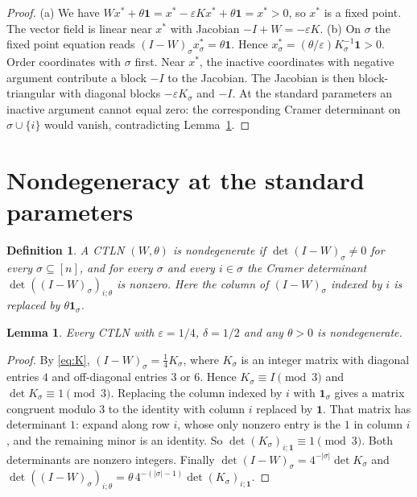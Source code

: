 \documentclass[11pt]{amsart}
\newtheorem{lemma}[theorem]{Lemma}
\newtheorem{definition}[theorem]{Definition}
\theoremstyle{remark}
\newcommand{\one}{\mathbf 1}
\begin{document}
\begin{proof}
(a) We have $Wx^*+\theta\one=x^*-\varepsilon Kx^*+\theta\one=x^*>0$, so $x^*$ is a fixed point. The vector field is linear near $x^*$ with Jacobian $-I+W=-\varepsilon K$.
(b) On $\sigma$ the fixed point equation reads $(I-W)_\sigma x^*_\sigma=\theta\one$. Hence $x^*_\sigma=(\theta/\varepsilon)K_\sigma^{-1}\one>0$. Order coordinates with $\sigma$ first. Near $x^*$, the inactive coordinates with negative argument contribute a block $-I$ to the Jacobian. The Jacobian is then block-triangular with diagonal blocks $-\varepsilon K_\sigma$ and $-I$. At the standard parameters an inactive argument cannot equal zero: the corresponding Cramer determinant on $\sigma\cup\{i\}$ would vanish, contradicting Lemma~\ref{lem:mod3}.
\end{proof}

\section{Nondegeneracy at the standard parameters}

\begin{definition}\label{def:nondeg}
\cite[Definition~2.1]{CGM2024} A CTLN $(W,\theta)$ is \emph{nondegenerate} if $\det(I-W)_\sigma\ne0$ for every $\sigma\subseteq[n]$, and for every $\sigma$ and every $i\in\sigma$ the Cramer determinant $\det((I-W)_\sigma)_{i;\theta}$ is nonzero. Here the column of $(I-W)_\sigma$ indexed by $i$ is replaced by $\theta\one_\sigma$.
\end{definition}

\begin{lemma}\label{lem:mod3}
Every CTLN with $\varepsilon=1/4$, $\delta=1/2$ and any $\theta>0$ is nondegenerate.
\end{lemma}

\begin{proof}
By \eqref{eq:K}, $(I-W)_\sigma=\tfrac14K_\sigma$, where $K_\sigma$ is an integer matrix with diagonal entries $4$ and off-diagonal entries $3$ or $6$. Hence $K_\sigma\equiv I\pmod 3$ and $\det K_\sigma\equiv1\pmod3$. Replacing the column indexed by $i$ with $\one_\sigma$ gives a matrix congruent modulo $3$ to the identity with column $i$ replaced by $\one$. That matrix has determinant $1$: expand along row $i$, whose only nonzero entry is the $1$ in column $i$, and the remaining minor is an identity. So $\det(K_\sigma)_{i;\one}\equiv1\pmod 3$. Both determinants are nonzero integers. Finally $\det(I-W)_\sigma=4^{-|\sigma|}\det K_\sigma$ and $\det((I-W)_\sigma)_{i;\theta}=\theta\,4^{-(|\sigma|-1)}\det(K_\sigma)_{i;\one}$.
\end{proof}
\end{document}
